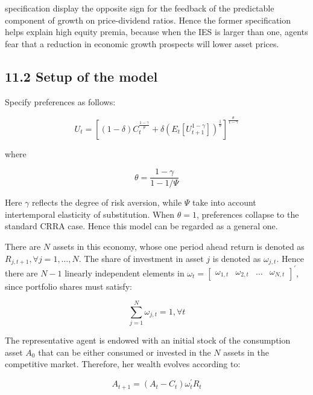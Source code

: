 \documentclass[10pt]{article}
\begin{document}
specification display the opposite sign for the feedback of the predictable component of growth on price-dividend ratios. Hence the former specification helps explain high equity premia, because when the IES is larger than one, agents fear that a reduction in economic growth prospects will lower asset prices.

\subsection*{11.2 Setup of the model}
Specify preferences as follows:


\begin{equation*}
U_{t}=\left[(1-\delta) C_{t}^{\frac{1-\gamma}{\theta}}+\delta\left(E_{t}\left[U_{t+1}^{1-\gamma}\right]\right)^{\frac{1}{\theta}}\right]^{\frac{\theta}{1-\gamma}} \tag{49}
\end{equation*}


where


\begin{equation*}
\theta=\frac{1-\gamma}{1-1 / \Psi} \tag{50}
\end{equation*}


Here $\gamma$ reflects the degree of risk aversion, while $\Psi$ take into account intertemporal elasticity of substitution. When $\theta=1$, preferences collapse to the standard CRRA case. Hence this model can be regarded as a general one.

There are $N$ assets in this economy, whose one period ahead return is denoted as $R_{j, t+1}, \forall j=1, \ldots, N$. The share of investment in asset $j$ is denoted as $\omega_{j, t}$. Hence there are $N-1$ linearly independent elements in $\omega_{t}= \left[\begin{array}{llll}\omega_{1, t} & \omega_{2, t} & \ldots & \omega_{N, t}\end{array}\right]^{\prime}$, since portfolio shares must satisfy:


\begin{equation*}
\sum_{j=1}^{N} \omega_{j, t}=1, \forall t \tag{51}
\end{equation*}


The representative agent is endowed with an initial stock of the consumption asset $A_{0}$ that can be either consumed or invested in the $N$ assets in the competitive market. Therefore, her wealth evolves according to:


\begin{equation*}
A_{t+1}=\left(A_{t}-C_{t}\right) \omega_{t}^{\prime} R_{t} \tag{52}
\end{equation*}
\end{document}
